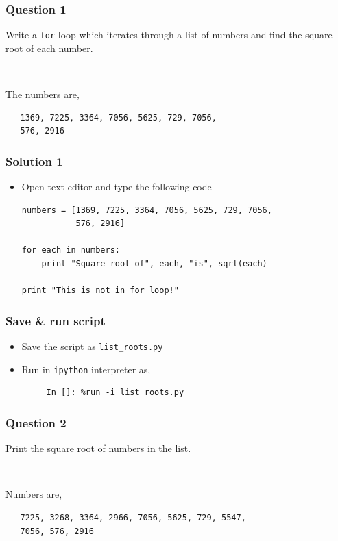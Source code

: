 \documentclass[presentation]{beamer}
\begin{document}
\begin{frame}[fragile]
\frametitle{Question 1}
\label{sec-4}

  Write a \verb~for~ loop which iterates through a list of numbers and find
  the square root of each number.
\begin{verbatim}
   
\end{verbatim}

  The numbers are,
\begin{verbatim}
   1369, 7225, 3364, 7056, 5625, 729, 7056, 
   576, 2916
\end{verbatim}
\end{frame}
\begin{frame}[fragile]
\frametitle{Solution 1}
\label{sec-5}


\begin{itemize}
\item Open text editor and type the following code
\lstset{language=Python}
\begin{lstlisting}
numbers = [1369, 7225, 3364, 7056, 5625, 729, 7056, 
           576, 2916]

for each in numbers:
    print "Square root of", each, "is", sqrt(each)

print "This is not in for loop!"
\end{lstlisting}
\end{itemize}
\end{frame}
\begin{frame}[fragile]
\frametitle{Save \& run script}
\label{sec-6}


\begin{itemize}
\item Save the script as \verb~list_roots.py~
\item Run in \verb~ipython~ interpreter as,
\begin{verbatim}
     In []: %run -i list_roots.py
\end{verbatim}

\end{itemize}
\end{frame}
\begin{frame}[fragile]
\frametitle{Question 2}
\label{sec-7}

  Print the square root of numbers in the list.
\begin{verbatim}
   
\end{verbatim}

  Numbers are,
\begin{verbatim}
   7225, 3268, 3364, 2966, 7056, 5625, 729, 5547, 
   7056, 576, 2916
\end{verbatim}
\end{frame}
\end{document}
